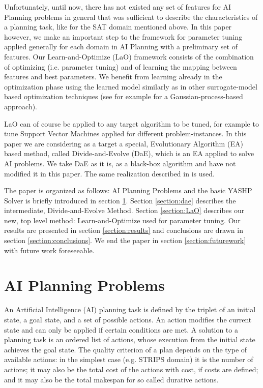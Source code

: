 \documentclass{acm_proc_article-sp}
\begin{document}
Unfortunately, until now, there has not existed any set of features for AI Planning problems in general that was sufficient to describe the characteristics of a planning task, like for the SAT domain \cite{Hutter06} mentioned above. In this paper however, we make an important step to the framework for parameter tuning applied generally for each domain in AI Planning with a preliminary set of features. Our Learn-and-Optimize (LaO) framework consists of the combination of optimizing (i.e. parameter tuning) and of learning the mapping between features and best parameters. We benefit from learning already in the optimization phase using the learned model similarly as in other surrogate-model based optimization techniques (see for example \cite{Bardenet} for a Gaussian-process-based approach).

LaO can of course be applied to any target algorithm to be tuned, for example to tune Support Vector Machines applied for different problem-instances. In this paper we are considering as a target a special, Evolutionary Algorithm (EA) based method, called Divide-and-Evolve (DaE), which is an EA applied to solve AI problems. We take DaE as it is, as a black-box algorithm and have not modified it in this paper. The same realization described in \cite{BibEvoCop:2010} is used. 

The paper is organized as follows: AI Planning Problems and the basic YASHP Solver is briefly introduced in section \ref{section:planning}. Section \ref{section:dae} describes the intermediate, Divide-and-Evolve Method. Section \ref{section:LaO} describes our new, top level method: Learn-and-Optimize used for parameter tuning. Our results are presented in section \ref{section:results} and conclusions are drawn in section \ref{section:conclusions}. We end the paper in section \ref{section:futurework} with future work foreseeable.

\section{AI Planning Problems}
\label{section:planning}

An Artificial Intelligence (AI) planning task is defined by the triplet of an initial state, a goal state, and a set of possible actions. An action modifies the current state and can only be applied if certain conditions are met. A solution to a planning task is an ordered list of actions, whose execution from the initial state achieves the goal state. The quality criterion of a plan depends on the type of available actions: in the simplest case (e.g. STRIPS domain) it is the number of actions; it may also be the total cost of the actions with cost, if costs are defined; and it may also be the total makespan for so called durative actions.
\end{document}
